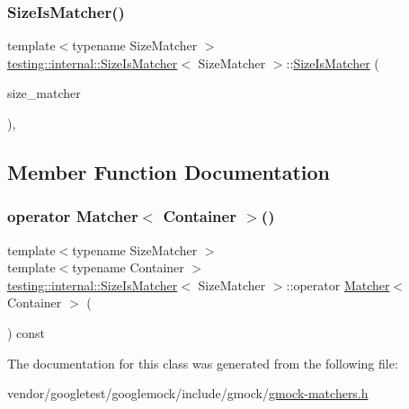 \subsubsection{\texorpdfstring{Size\+Is\+Matcher()}{SizeIsMatcher()}}
{\footnotesize\ttfamily template$<$typename Size\+Matcher $>$ \\
\hyperlink{classtesting_1_1internal_1_1_size_is_matcher}{testing\+::internal\+::\+Size\+Is\+Matcher}$<$ Size\+Matcher $>$\+::\hyperlink{classtesting_1_1internal_1_1_size_is_matcher}{Size\+Is\+Matcher} (\begin{DoxyParamCaption}\item[{const Size\+Matcher \&}]{size\+\_\+matcher }\end{DoxyParamCaption})\hspace{0.3cm}{\ttfamily [inline]}, {\ttfamily [explicit]}}



\subsection{Member Function Documentation}
\mbox{\label{classtesting_1_1internal_1_1_size_is_matcher_abeb0ee5ead7c7a3066dab0d4efe793ea}} 
\subsubsection{\texorpdfstring{operator Matcher$<$ Container $>$()}{operator Matcher< Container >()}}
{\footnotesize\ttfamily template$<$typename Size\+Matcher $>$ \\
template$<$typename Container $>$ \\
\hyperlink{classtesting_1_1internal_1_1_size_is_matcher}{testing\+::internal\+::\+Size\+Is\+Matcher}$<$ Size\+Matcher $>$\+::operator \hyperlink{classtesting_1_1_matcher}{Matcher}$<$ Container $>$ (\begin{DoxyParamCaption}{ }\end{DoxyParamCaption}) const\hspace{0.3cm}{\ttfamily [inline]}}



The documentation for this class was generated from the following file\+:\begin{DoxyCompactItemize}
\item 
vendor/googletest/googlemock/include/gmock/\hyperlink{gmock-matchers_8h}{gmock-\/matchers.\+h}\end{DoxyCompactItemize}
